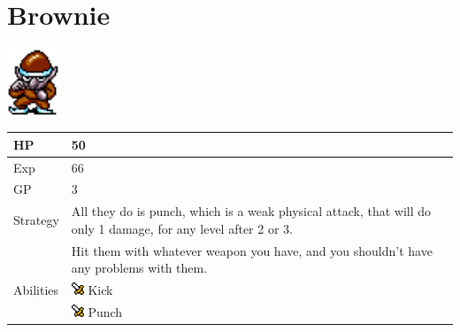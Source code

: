 \section{Brownie}
\label{monster:brownie}

\includegraphics[height=2cm,keepaspectratio]{./resources/monster/brownie}

\begin{longtable}{ l p{9cm} }
	HP
	& 50
\\ \hline
	Exp
	& 66
\\ \hline
	GP
	& 3
\\ \hline
	Strategy
	& All they do is punch, which is a weak physical attack, that will do only 1 damage, for any level after 2 or 3. \\
	& Hit them with whatever weapon you have, and you shouldn't have any problems with them.
\\ \hline
	Abilities
	& \includegraphics[height=1em,keepaspectratio]{./resources/effects/damage} Kick \\
	& \includegraphics[height=1em,keepaspectratio]{./resources/effects/damage} Punch
\end{longtable}
